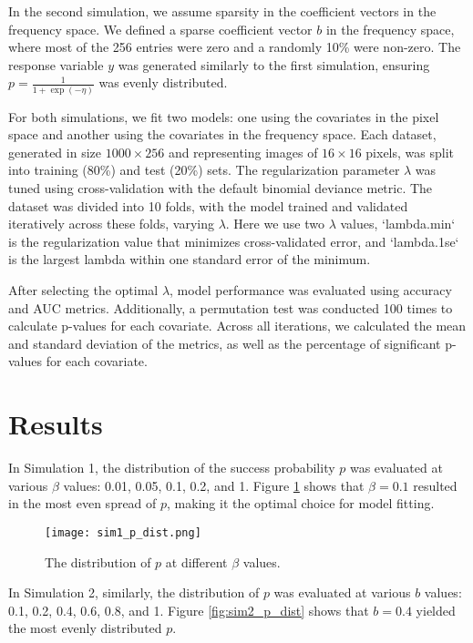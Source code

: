 \documentclass[12pt]{article}
\begin{document}
In the second simulation, we assume sparsity in the coefficient vectors in the
frequency space. We defined a sparse coefficient vector \( b \) in the
frequency space, where most of the 256 entries were zero and a randomly 10\%
were non-zero. The response variable \( y \) was generated similarly to the
first simulation, ensuring \( p = \frac{1}{1 + \exp(-\eta)} \) was evenly
distributed.

For both simulations, we fit two models: one using the covariates in the pixel
space and another using the covariates in the frequency space. Each dataset,
generated in size \( 1000 \times 256 \) and representing images of \( 16 \times
16 \) pixels, was split into training (80\%) and test (20\%) sets. The
regularization parameter \( \lambda \) was tuned using cross-validation with
the default binomial deviance metric. The dataset was divided into 10 folds,
with the model trained and validated iteratively across these folds, varying \(
\lambda \). Here we use two \( \lambda \) values, `lambda.min` is the
regularization value that minimizes cross-validated error, and `lambda.1se` is
the largest lambda within one standard error of the minimum.

After selecting the optimal \( \lambda \), model performance was evaluated
using accuracy and AUC metrics. Additionally, a permutation test was conducted
100 times to calculate p-values for each covariate. Across all iterations, we
calculated the mean and standard deviation of the metrics, as well as the
percentage of significant p-values for each covariate.

\clearpage

\section*{Results}

In Simulation 1, the distribution of the success probability \( p \) was
evaluated at various \( \beta \) values: 0.01, 0.05, 0.1, 0.2, and 1. Figure
\ref{fig:sim1_p_dist} shows that \( \beta = 0.1 \) resulted in the most even
spread of \( p \), making it the optimal choice for model fitting.

\begin{figure}[htbp] 
	\centering
	\texttt{[image: sim1\_p\_dist.png]} 
	\caption{The distribution of \(p\) at different \(\beta\) values.}
	\label{fig:sim1_p_dist} 
\end{figure}

In Simulation 2, similarly, the distribution of \( p \) was evaluated at
various \( b \) values: 0.1, 0.2, 0.4, 0.6, 0.8, and 1. Figure
\ref{fig:sim2_p_dist} shows that \( b = 0.4 \) yielded the most evenly
distributed \( p \).
\end{document}
